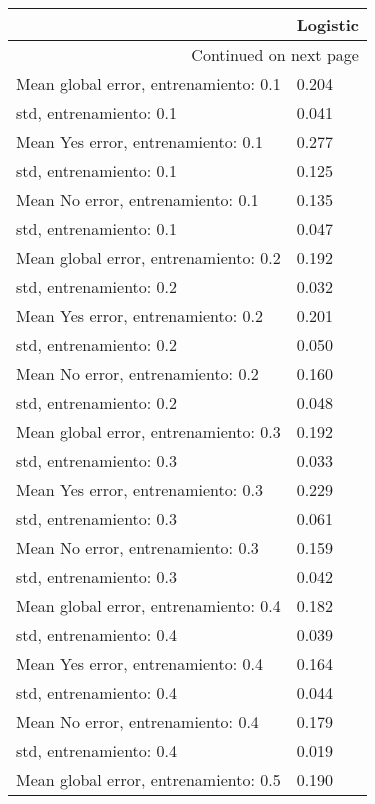 \begin{longtable}{p{4cm}|p{1.5cm}}
\toprule
{} &  Logistic \\
\midrule
\endhead
\midrule
\multicolumn{2}{r}{{Continued on next page}} \\
\midrule
\endfoot

\bottomrule
\endlastfoot
Mean global error, entrenamiento: 0.1 &     0.204 \\
std, entrenamiento: 0.1               &     0.041 \\
Mean Yes error, entrenamiento: 0.1    &     0.277 \\
std, entrenamiento: 0.1               &     0.125 \\
Mean No error, entrenamiento: 0.1     &     0.135 \\
std, entrenamiento: 0.1               &     0.047 \\
Mean global error, entrenamiento: 0.2 &     0.192 \\
std, entrenamiento: 0.2               &     0.032 \\
Mean Yes error, entrenamiento: 0.2    &     0.201 \\
std, entrenamiento: 0.2               &     0.050 \\
Mean No error, entrenamiento: 0.2     &     0.160 \\
std, entrenamiento: 0.2               &     0.048 \\
Mean global error, entrenamiento: 0.3 &     0.192 \\
std, entrenamiento: 0.3               &     0.033 \\
Mean Yes error, entrenamiento: 0.3    &     0.229 \\
std, entrenamiento: 0.3               &     0.061 \\
Mean No error, entrenamiento: 0.3     &     0.159 \\
std, entrenamiento: 0.3               &     0.042 \\
Mean global error, entrenamiento: 0.4 &     0.182 \\
std, entrenamiento: 0.4               &     0.039 \\
Mean Yes error, entrenamiento: 0.4    &     0.164 \\
std, entrenamiento: 0.4               &     0.044 \\
Mean No error, entrenamiento: 0.4     &     0.179 \\
std, entrenamiento: 0.4               &     0.019 \\
Mean global error, entrenamiento: 0.5 &     0.190 \\

\end{longtable}
